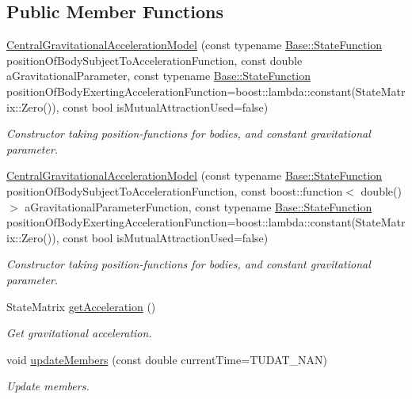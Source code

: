 \subsection*{Public Member Functions}
\begin{DoxyCompactItemize}
\item 
\hyperlink{classtudat_1_1gravitation_1_1CentralGravitationalAccelerationModel_ab6635cb21ad3775dbbe8befd6e3059fc}{Central\+Gravitational\+Acceleration\+Model} (const typename \hyperlink{classtudat_1_1gravitation_1_1SphericalHarmonicsGravitationalAccelerationModelBase_a4ca706c4f941be481fc5f490e49390d8}{Base\+::\+State\+Function} position\+Of\+Body\+Subject\+To\+Acceleration\+Function, const double a\+Gravitational\+Parameter, const typename \hyperlink{classtudat_1_1gravitation_1_1SphericalHarmonicsGravitationalAccelerationModelBase_a4ca706c4f941be481fc5f490e49390d8}{Base\+::\+State\+Function} position\+Of\+Body\+Exerting\+Acceleration\+Function=boost\+::lambda\+::constant(State\+Matrix\+::\+Zero()), const bool is\+Mutual\+Attraction\+Used=false)
\begin{DoxyCompactList}\small\item\em Constructor taking position-\/functions for bodies, and constant gravitational parameter. \end{DoxyCompactList}\item 
\hyperlink{classtudat_1_1gravitation_1_1CentralGravitationalAccelerationModel_af6a29bd8bfba41f586d47978ad4cc73e}{Central\+Gravitational\+Acceleration\+Model} (const typename \hyperlink{classtudat_1_1gravitation_1_1SphericalHarmonicsGravitationalAccelerationModelBase_a4ca706c4f941be481fc5f490e49390d8}{Base\+::\+State\+Function} position\+Of\+Body\+Subject\+To\+Acceleration\+Function, const boost\+::function$<$ double() $>$ a\+Gravitational\+Parameter\+Function, const typename \hyperlink{classtudat_1_1gravitation_1_1SphericalHarmonicsGravitationalAccelerationModelBase_a4ca706c4f941be481fc5f490e49390d8}{Base\+::\+State\+Function} position\+Of\+Body\+Exerting\+Acceleration\+Function=boost\+::lambda\+::constant(State\+Matrix\+::\+Zero()), const bool is\+Mutual\+Attraction\+Used=false)
\begin{DoxyCompactList}\small\item\em Constructor taking position-\/functions for bodies, and constant gravitational parameter. \end{DoxyCompactList}\item 
State\+Matrix \hyperlink{classtudat_1_1gravitation_1_1CentralGravitationalAccelerationModel_a1dc811759664e99193f323e02b0a4fe9}{get\+Acceleration} ()
\begin{DoxyCompactList}\small\item\em Get gravitational acceleration. \end{DoxyCompactList}\item 
void \hyperlink{classtudat_1_1gravitation_1_1CentralGravitationalAccelerationModel_a9430ea27b71056959af94b2f92353f62}{update\+Members} (const double current\+Time=T\+U\+D\+A\+T\+\_\+\+N\+AN)
\begin{DoxyCompactList}\small\item\em Update members. \end{DoxyCompactList}\end{DoxyCompactItemize}
